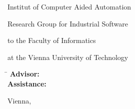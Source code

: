 \begin{otherlanguage}{english}
\begin{center}
\begin{minipage}[t][3cm][t]{\textwidth}
  Institut of Computer Aided Automation

  Research Group for Industrial Software

  to the Faculty of Informatics 

  at the Vienna University of Technology
\end{minipage}

\end{center}

\begin{minipage}[t][3.5cm][t]{\textwidth}%
  \vspace{0pt}\raggedright\thesistitlefontnormalsize\sffamily
  \begin{tabbing}%
	    \hspace{21mm} \= \hspace{66mm} \kill
	    \textbf{Advisor:} \> \tuinfthesisbetreins\\
	    \ifAssistance
	    \textbf{Assistance:} \> \tuinfthesisbetrzwei\\
	                \> \tuinfthesisbetrdrei
	    \fi
  \end{tabbing}
\end{minipage}

\begin{minipage}[t][1cm][t]{\textwidth}%
  \vspace{0pt}\sffamily\thesistitlefontnormalsize
  Vienna, \tuinfthesisdate
\end{minipage}

\end{otherlanguage}




\restoregeometry


